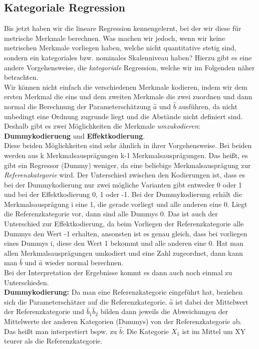 \documentclass[a4paper]{article}
\begin{document}
\subsection{Kategoriale Regression} \label{sec:Kategoriale Regression}
Bis jetzt haben wir die lineare Regression kennengelernt, bei der wir diese für metrische Merkmale berechnen. Was machen wir jedoch, wenn wir keine metrischen Merkmale vorliegen haben, welche nicht quantitative stetig sind, sondern ein kategoriales bzw. nominales Skalenniveau haben? Hierzu gibt es eine andere Vorgehensweise, die \textit{kategoriale} Regression, welche wir im Folgenden näher betrachten.\\
Wir können nicht einfach die verschiedenen Merkmale kodieren, indem wir dem ersten Merkmal die eins und dem zweiten Merkmale die zwei zuordnen und dann normal die Berechnung der Parameterschätzung $\hat{a}$ und $\hat{b}$ ausführen, da nicht unbedingt eine Ordnung zugrunde liegt und die Abstände nicht definiert sind. Deshalb gibt es zwei Möglichkeiten die Merkmale \textit{umzukodieren}: \textbf{Dummykodierueng} und \textbf{Effektkodierung}.\\
Diese beiden Möglichkeiten sind sehr ähnlich in ihrer Vorgehensweise. Bei beiden werden aus k Merkmalsausprägungen k-1 Merkmalsausprägungen. Das heißt, es gibt ein Regressor (Dummy) weniger, da eine beliebige Merkmalsausprägung zur \textit{Referenzkategorie} wird.
Der Unterschied zwischen den Kodierungen ist, dass es bei der Dummykodierung nur zwei mögliche Varianten gibt entweder 0 oder 1 und bei der Effektkodierung 0, 1 oder -1.
Bei der Dummykodierung erhält die Merkmalsausprägung i eine 1, die gerade vorliegt und alle anderen eine 0. Liegt die Referenzkategorie vor, dann sind alle Dummys 0. Das ist auch der Unterschied zur Effektkodierung, da beim Vorliegen der Referenzkategorie alle Dummys den Wert -1 erhalten, ansonsten ist es genau gleich, dass bei vorliegen eines Dummys i, diese den Wert 1 bekommt und alle anderen eine 0.
Hat man allen Merkmalsausprägungen umkodiert und eine Zahl zugeordnet, dann kann man $\hat{b}$ und $\hat{a}$ wieder normal berechnen. \\
Bei der Interpretation der Ergebnisse kommt es dann auch noch einmal zu Unterschieden.\\
\textbf{Dummykodierung:} Da man eine Referenzkategorie eingeführt hat, beziehen sich die Parameterschätzer auf die Referenzkategorie. $\hat{a}$ ist dabei der Mittelwert der Referenzkategorie und $\hat{b}_1\hat{b}_2$ bilden dann jeweils die Abweichungen der Mittelwerte der anderen Kategorien (Dummys) von der Referenzkategorie ab. Das heißt man interpretiert bspw. zu $\hat{b}$: Die Kategorie $X_1$ ist im Mittel um XY teurer als die Referenzkategorie.\\
\end{document}
